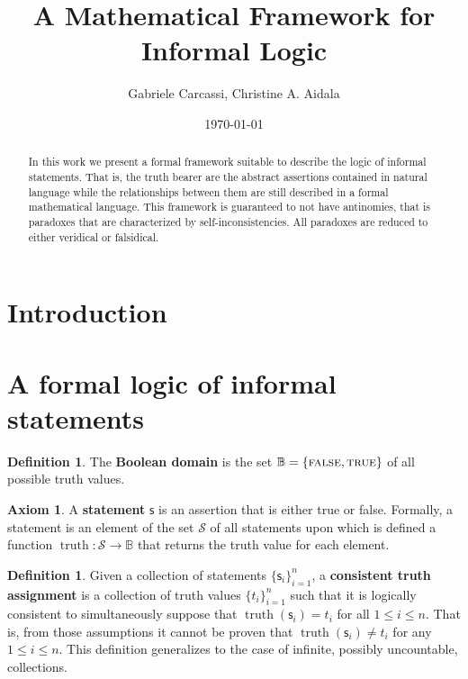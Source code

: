 \documentclass[letterpaper]{article}
\theoremstyle{plain}%
\theoremstyle{definition}
\newtheorem{defn}[thrm]{Definition}
\newtheorem{axiom}[thrm]{Axiom}
\theoremstyle{remark}
\DeclareMathOperator{\truth}{truth}
\def\TRUE{\textsc{true}}
\def\FALSE{\textsc{false}}
\newcommand{\stmt}[1][s] {\mathsf{#1}}
\begin{document}
\title{A Mathematical Framework for Informal Logic}
\author{Gabriele Carcassi, Christine A. Aidala}

\date{\today}

\maketitle

\begin{abstract}
	In this work we present a formal framework suitable to describe the logic of informal statements. That is, the truth bearer are the abstract assertions contained in natural language while the relationships between them are still described in a formal mathematical language. This framework is guaranteed to not have antinomies, that is paradoxes that are characterized by self-inconsistencies. All paradoxes are reduced to either veridical or falsidical.
\end{abstract}


\section{Introduction}


\section{A formal logic of informal statements}

\begin{defn}
	The \textbf{Boolean domain} is the set $\mathbb{B} = \{\FALSE, \TRUE\}$ of all possible truth values.
\end{defn}

\begin{axiom}\label{ax_statement}
	A \textbf{statement} $\stmt$ is an assertion that is either true or false. Formally, a statement is an element of the set $\mathcal{S}$ of all statements upon which is defined a function $\truth: \mathcal{S} \to \mathbb{B}$ that returns the truth value for each element.
\end{axiom}

\begin{defn}
	Given a collection of statements $\{\stmt_i\}^n_{i=1}$, a \textbf{consistent truth assignment} is a collection of truth values $\{t_i\}^n_{i=1}$ such that it is logically consistent to simultaneously suppose that $\truth(\stmt_i) = t_i$ for all $1 \leq i \leq n$. That is, from those assumptions it cannot be proven that $\truth(\stmt_i) \neq t_i$ for any $1 \leq i \leq n$.  This definition generalizes to the case of infinite, possibly uncountable, collections.
\end{defn}
\end{document}
